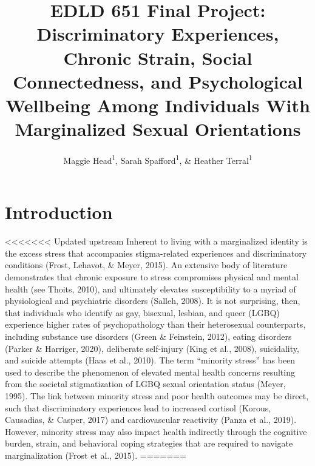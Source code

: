 \documentclass[
  english,
  man,floatsintext]{apa6}
\title{EDLD 651 Final Project: Discriminatory Experiences, Chronic Strain, Social Connectedness, and Psychological Wellbeing Among Individuals With Marginalized Sexual Orientations}
\author{Maggie Head\textsuperscript{1}, Sarah Spafford\textsuperscript{1}, \& Heather Terral\textsuperscript{1}}
\date{}
\affiliation{\vspace{0.5cm}\textsuperscript{1} University of Oregon}
\begin{document}
\maketitle

\hypertarget{introduction}{%
\section{Introduction}\label{introduction}}

<<<<<<< Updated upstream
Inherent to living with a marginalized identity is the excess stress that accompanies stigma-related experiences and discriminatory conditions (Frost, Lehavot, \& Meyer, 2015). An extensive body of literature demonstrates that chronic exposure to stress compromises physical and mental health (see Thoits, 2010), and ultimately elevates susceptibility to a myriad of physiological and psychiatric disorders (Salleh, 2008). It is not surprising, then, that individuals who identify as gay, bisexual, lesbian, and queer (LGBQ) experience higher rates of psychopathology than their heterosexual counterparts, including substance use disorders (Green \& Feinstein, 2012), eating disorders (Parker \& Harriger, 2020), deliberate self-injury (King et al., 2008), suicidality, and suicide attempts (Haas et al., 2010). The term \enquote{minority stress} has been used to describe the phenomenon of elevated mental health concerns resulting from the societal stigmatization of LGBQ sexual orientation status (Meyer, 1995). The link between minority stress and poor health outcomes may be direct, such that discriminatory experiences lead to increased cortisol (Korous, Causadias, \& Casper, 2017) and cardiovascular reactivity (Panza et al., 2019). However, minority stress may also impact health indirectly through the cognitive burden, strain, and behavioral coping strategies that are required to navigate marginalization (Frost et al., 2015).
=======
\end{document}
